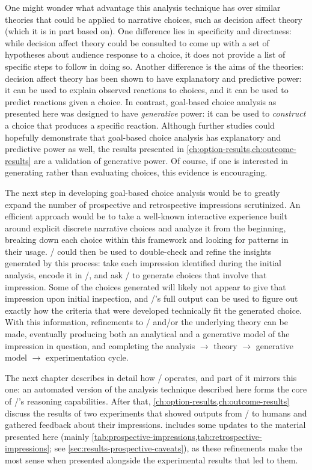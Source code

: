 One might wonder what advantage this analysis technique has over similar theories that could be applied to narrative choices, such as decision affect theory \citep{Mellers1997} (which it is in part based on).
%
One difference lies in specificity and directness: while decision affect theory could be consulted to come up with a set of hypotheses about audience response to a choice, it does not provide a list of specific steps to follow in doing so.
%
Another difference is the aims of the theories: decision affect theory has been shown to have explanatory and predictive power: it can be used to explain observed reactions to choices, and it can be used to predict reactions given a choice.
%
In contrast, goal-based choice analysis as presented here was designed to have \emph{generative} power: it can be used to \emph{construct} a choice that produces a specific reaction.
%
Although further studies could hopefully demonstrate that goal-based choice analysis has explanatory and predictive power as well, the results presented in \cref{ch:option-results,ch:outcome-results} are a validation of generative power.
%
Of course, if one is interested in generating rather than evaluating choices, this evidence is encouraging.


The next step in developing goal-based choice analysis would be to greatly expand the number of prospective and retrospective impressions scrutinized.
%
An efficient approach would be to take a well-known interactive experience built around explicit discrete narrative choices and analyze it from the beginning, breaking down each choice within this framework and looking for patterns in their usage.
%
\dunyazad/ could then be used to double-check and refine the insights generated by this process: take each impression identified during the initial analysis, encode it in \dunyazad/, and ask \dunyazad/ to generate choices that involve that impression.
%
Some of the choices generated will likely not appear to give that impression upon initial inspection, and \dunyazad/'s full output can be used to figure out exactly how the criteria that were developed technically fit the generated choice.
%
With this information, refinements to \dunyazad/ and/or the underlying theory can be made, eventually producing both an analytical and a generative model of the impression in question, and completing the analysis $\rightarrow$ theory $\rightarrow$ generative model $\rightarrow$ experimentation cycle.


The next chapter describes in detail how \dunyazad/ operates, and part of it mirrors this one: an automated version of the analysis technique described here forms the core of \dunyazad/'s reasoning capabilities.
%
After that, \cref{ch:option-results,ch:outcome-results} discuss the results of two experiments that showed outputs from \dunyazad/ to humans and gathered feedback about their impressions.
%
 includes some updates to the material presented here (mainly \cref{tab:prospective-impressions,tab:retrospective-impressions}; see \cref{sec:results-prospective-caveats}), as these refinements make the most sense when presented alongside the experimental results that led to them.

